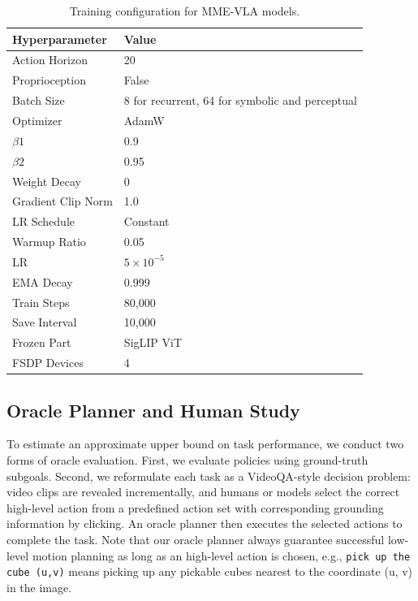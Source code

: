 \begin{table}[h]
\centering
\small
\caption{Training configuration for MME-VLA models.}
\begin{tabular}{ll}
\toprule
\textbf{Hyperparameter} & \textbf{Value} \\
\midrule
Action Horizon & 20 \\
Proprioception & False \\
Batch Size  & 8 for recurrent, 64 for symbolic and perceptual  \\
Optimizer & AdamW \\
$\beta1$ & 0.9 \\
$\beta2$ &  0.95 \\
Weight Decay & 0 \\
Gradient Clip Norm & 1.0 \\
LR Schedule & Constant \\
Warmup Ratio & 0.05 \\
LR & $5\times 10^{-5}$ \\
EMA Decay & 0.999 \\
Train Steps & 80{,}000 \\
Save Interval & 10{,}000 \\
Frozen Part & SigLIP ViT \\
FSDP Devices & 4 \\
\bottomrule
\end{tabular}
\label{tab:train_hparams_historypi05}
\end{table}

\clearpage


\subsection{Oracle Planner and Human Study}
\label{sec:human}

To estimate an approximate upper bound on task performance, we conduct two forms of oracle evaluation.  
First, we evaluate policies using ground-truth subgoals.  
Second, we reformulate each task as a VideoQA-style decision problem: video clips are revealed incrementally, and humans or models select the correct high-level action from a predefined action set with corresponding grounding information by clicking. An oracle planner then executes the selected actions to complete the task. Note that our oracle planner always guarantee successful low-level motion planning as long as an high-level action is chosen, e.g.,  \texttt{pick up the cube (u,v)} means picking up any pickable cubes nearest to the coordinate (u, v) in the image.

